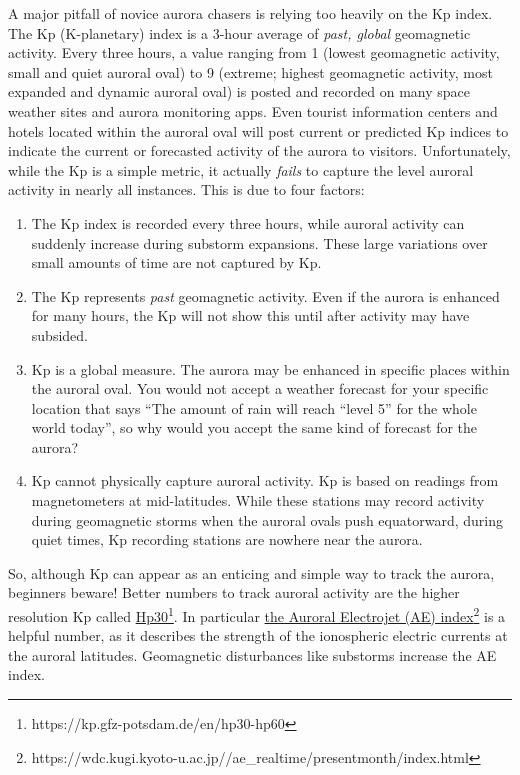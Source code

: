 \documentclass{article}
\begin{document}
A major pitfall of novice aurora chasers is relying too heavily on the Kp index. The Kp (K-planetary) index is a 3-hour average of \textit{past, global} geomagnetic activity. Every three hours, a value ranging from 1 (lowest geomagnetic activity, small and quiet auroral oval) to 9 (extreme; highest geomagnetic activity, most expanded and dynamic auroral oval) is posted and recorded on many space weather sites and aurora monitoring apps. Even tourist information centers and hotels located within the auroral oval will post current or predicted Kp indices to indicate the current or forecasted activity of the aurora to visitors. Unfortunately, while the Kp is a simple metric, it actually \textit{fails} to capture the level auroral activity in nearly all instances. This is due to four factors:
\begin{enumerate}
    \item The Kp index is recorded every three hours, while auroral activity can suddenly increase during substorm expansions. These large variations over small amounts of time are not captured by Kp.
    \item The Kp represents \textit{past} geomagnetic activity. Even if the aurora is enhanced for many hours, the Kp will not show this until after activity may have subsided.
    \item Kp is a global measure. The aurora may be enhanced in specific places within the auroral oval. You would not accept a weather forecast for your specific location that says ``The amount of rain will reach ``level 5'' for the whole world today'', so why would you accept the same kind of forecast for the aurora?
    \item Kp cannot physically capture auroral activity. Kp is based on readings from magnetometers at mid-latitudes. While these stations may record activity during geomagnetic storms when the auroral ovals push equatorward, during quiet times, Kp recording stations are nowhere near the aurora.
\end{enumerate}
So, although Kp can appear as an enticing and simple way to track the aurora, beginners beware! 
Better numbers to track auroral activity are the higher resolution Kp called \href{https://kp.gfz-potsdam.de/en/hp30-hp60}{Hp30}\footnote{https://kp.gfz-potsdam.de/en/hp30-hp60}. In particular \href{http://wdc.kugi.kyoto-u.ac.jp/ae_realtime/presentmonth/index.html}{the Auroral Electrojet (AE) index}\footnote{https://wdc.kugi.kyoto-u.ac.jp//ae\_realtime/presentmonth/index.html} is a helpful number, as it describes the strength of the ionospheric electric currents at the auroral latitudes. Geomagnetic disturbances like substorms increase the AE index.
\end{document}
